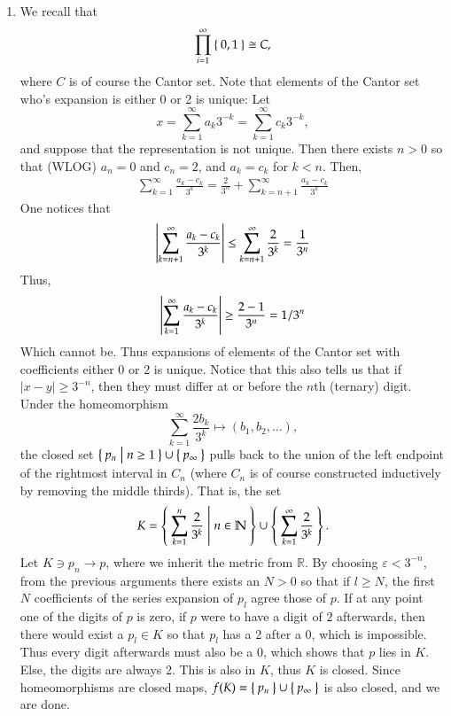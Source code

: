 \documentclass[12pt]{article}
\theoremstyle{definitionstyle}
\def\mbb#1{\mathbb{#1}}
\def\bN{\mbb{N}}
\def \R{\mbb{R}}
\def \ve{\varepsilon}
\begin{document}
\begin{enumerate}[leftmargin=\labelsep]
		\item We recall that $$\prod_{i=1}^\infty \Set{0,1} \cong C,$$ where $C$ is of course the Cantor set. Note that elements of the Cantor set who's expansion is either 0 or 2 is unique:
		Let $$x = \sum_{k=1}^\infty a_k3^{-k} = \sum_{k=1}^\infty c_k3^{-k},$$ and suppose that the representation is not unique. Then there exists $n > 0$ so that (WLOG) $a_n = 0$ and $c_n = 2$, and $a_k = c_k$ for $k < n$. Then,
		\begin{align*}
			\sum_{k=1}^\infty \frac{a_k-c_k}{3^k} = \frac2{3^n} + \sum_{k=n+1}^\infty \frac{a_k-c_k}{3^k}
		\end{align*}
		One notices that
		\begin{align*}
			\qty|\sum_{k=n+1}^\infty \frac{a_k-c_k}{3^k}| \leq \sum_{k=n+1}^\infty \frac{2}{3^k} = \frac1{3^n}
		\end{align*}
		Thus,
		\begin{align*}
			\qty|\sum_{k=1}^\infty \frac{a_k-c_k}{3^k}| \geq \frac{2-1}{3^n} = 1/3^n
		\end{align*}
		Which cannot be. Thus expansions of elements of the Cantor set with coefficients either 0 or 2 is unique. Notice that this also tells us that if $|x-y| \geq 3^{-n}$, then they must differ at or before the $n$th (ternary) digit. Under the homeomorphism $$\sum_{k=1}^\infty 
		\frac{2b_k}{3^k} \mapsto (b_1, b_2, \ldots),$$ the closed set $\Set{p_n | n \geq 1} \cup \Set{p_\infty}$ pulls back to the union of the left endpoint of the rightmost interval in $C_n$ (where $C_n$ is of course constructed inductively by removing the middle thirds). That is, the set $$K = \Set{\sum_{k=1}^n \frac{2}{3^k} | n \in \bN} \cup \Set{\sum_{k=1}^\infty \frac{2}{3^k}}.$$ Let $K \ni p_n \to p$, where we inherit the metric from $\R$. By choosing $\ve < 3^{-n}$, from the previous arguments there exists an $N > 0$ so that if $l \geq N$, the first $N$ coefficients of the series expansion of $p_l$ agree those of $p$. If at any point one of the digits of $p$ is zero, if $p$ were to have a digit of $2$ afterwards, then there would exist a $p_l \in K$ so that $p_l$ has a 2 after a 0, which is impossible. Thus every digit afterwards must also be a 0, which shows that $p$ lies in $K$. Else, the digits are always 2. This is also in $K$, thus $K$ is closed. Since homeomorphisms are closed maps, $f(K) = \Set{p_n} \cup \Set{p_\infty}$ is also closed, and we are done.
		

\end{enumerate}
\end{document}
